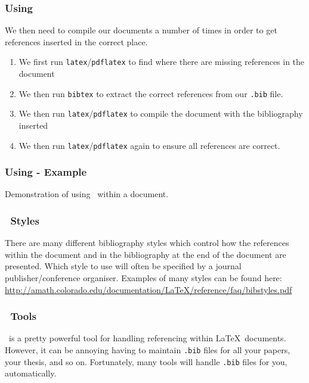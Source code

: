 \documentclass[mathserif]{beamer}
\begin{document}
\begin{frame}[fragile]
\frametitle{Using \BibTeX}

\vfill
We then need to compile our documents a number of times in order to get references inserted in the correct place.
\begin{enumerate}
	\item We first run \texttt{latex}/\texttt{pdflatex} to find where there are missing references in the document
	\item We then run \texttt{bibtex} to extract the correct references from our \texttt{.bib} file.
	\item We then run \texttt{latex}/\texttt{pdflatex} to compile the document with the bibliography inserted
	\item We then run \texttt{latex}/\texttt{pdflatex} again to ensure all references are correct.
\end{enumerate}
\vfill

\end{frame}


\begin{frame}[fragile]
\frametitle{Using \BibTeX - Example}

\vfill
Demonstration of using \BibTeX\ within a document.
\vfill

\end{frame}

\begin{frame}[fragile]
\frametitle{\BibTeX\ Styles}

\vfill
There are many different bibliography styles which control how the references within the document and in the bibliography at the end of the document are presented.
\vfill
Which style to use will often be specified by a journal publisher/conference organiser.
\vfill
Examples of many styles can be found here: \url{http://amath.colorado.edu/documentation/LaTeX/reference/faq/bibstyles.pdf}
\vfill

\end{frame}

\begin{frame}[fragile]
\frametitle{\BibTeX\ Tools}

\vfill
\BibTeX\ is a pretty powerful tool for handling referencing within \LaTeX\ documents.
\vfill
However, it can be annoying having to maintain \texttt{.bib} files for all your papers, your thesis, and so on.
\vfill
Fortunately, many tools will handle \texttt{.bib} files for you, automatically.
\vfill

\end{frame}
\end{document}
